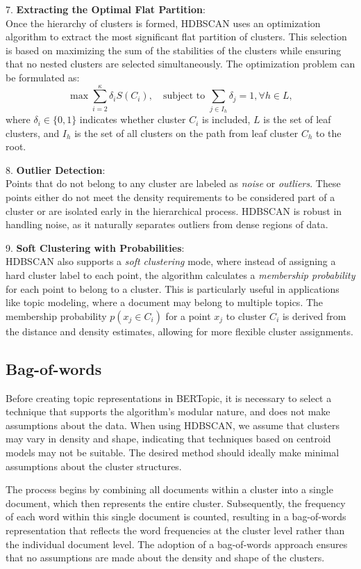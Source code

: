 7. \textbf{Extracting the Optimal Flat Partition}: \\
Once the hierarchy of clusters is formed, HDBSCAN uses an optimization algorithm to extract the most significant flat partition of clusters. This selection is based on maximizing the sum of the stabilities of the clusters while ensuring that no nested clusters are selected simultaneously. The optimization problem can be formulated as:
\[
    \max \sum_{i=2}^{\kappa} \delta_i S(C_i), \quad \text{subject to } \sum_{j \in I_h} \delta_j = 1, \forall h \in L,
\]
where $\delta_i \in \{0, 1\}$ indicates whether cluster $C_i$ is included, $L$ is the set of leaf clusters, and $I_h$ is the set of all clusters on the path from leaf cluster $C_h$ to the root.

8. \textbf{Outlier Detection}: \\
Points that do not belong to any cluster are labeled as \textit{noise} or \textit{outliers}. These points either do not meet the density requirements to be considered part of a cluster or are isolated early in the hierarchical process. HDBSCAN is robust in handling noise, as it naturally separates outliers from dense regions of data.

9. \textbf{Soft Clustering with Probabilities}: \\
HDBSCAN also supports a \textit{soft clustering} mode, where instead of assigning a hard cluster label to each point, the algorithm calculates a \textit{membership probability} for each point to belong to a cluster. This is particularly useful in applications like topic modeling, where a document may belong to multiple topics. The membership probability $p(x_j \in C_i)$ for a point $x_j$ to cluster $C_i$ is derived from the distance and density estimates, allowing for more flexible cluster assignments.

\subsection{Bag-of-words}

Before creating topic representations in BERTopic, it is necessary to select a technique that supports the algorithm's modular nature, and does not make assumptions about the data. When using HDBSCAN, we assume that clusters may vary in density and shape, indicating that techniques based on centroid models may not be suitable. The desired method should ideally make minimal assumptions about the cluster structures.

The process begins by combining all documents within a cluster into a single document, which then represents the entire cluster. Subsequently, the frequency of each word within this single document is counted, resulting in a bag-of-words representation that reflects the word frequencies at the cluster level rather than the individual document level. The adoption of a bag-of-words approach ensures that no assumptions are made about the density and shape of the clusters.

